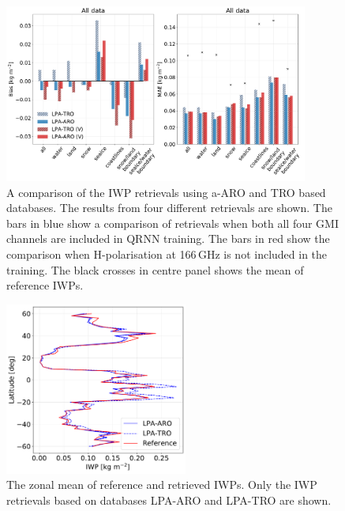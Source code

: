 \documentclass[amt, manuscript]{copernicus}
\begin{document}



\begin{figure}[t]
	\includegraphics[width=10cm]{Figures/ARO_TRO_v_vh_all.pdf}
	\caption{A comparison of the IWP retrievals using a-ARO and TRO based databases. The results from four different retrievals are shown. The bars in blue show a comparison of retrievals when both all four GMI channels are included in QRNN training. The bars in red show the comparison when H-polarisation at 166\,GHz is not included in the training. The black crosses in centre panel shows the mean of reference IWPs.  }
	\label{fig:bias_ARO_TRO}
\end{figure}

\begin{figure}[t]
	\includegraphics[width=6cm]{Figures/zonal_mean_all_jan_testdata.pdf}
	\caption{The zonal mean of reference and retrieved IWPs. Only the  IWP retrievals based on databases LPA-ARO and LPA-TRO are shown.}
	\label{fig:zonal_mean_test}
\end{figure}
\end{document}
